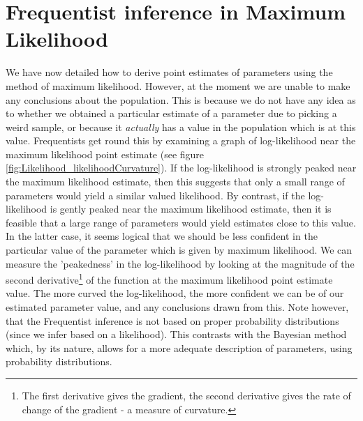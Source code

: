 \documentclass[11pt,fullpage]{book}
\begin{document}
\section{Frequentist inference in Maximum Likelihood}\label{sec:Likelihood_maxlikelihoodInference}
We have now detailed how to derive point estimates of parameters using the method of maximum likelihood. However, at the moment we are unable to make any conclusions about the population. This is because we do not have any idea as to whether we obtained a particular estimate of a parameter due to picking a weird sample, or because it \textit{actually} has a value in the population which is at this value. Frequentists get round this by examining a graph of log-likelihood near the maximum likelihood point estimate (see figure \ref{fig:Likelihood_likelihoodCurvature}). If the log-likelihood is strongly peaked near the maximum likelihood estimate, then this suggests that only a small range of parameters would yield a similar valued likelihood. By contrast, if the log-likelihood is gently peaked near the maximum likelihood estimate, then it is feasible that a large range of parameters would yield estimates close to this value. In the latter case, it seems logical that we should be less confident in the particular value of the parameter which is given by maximum likelihood. We can measure the 'peakedness' in the log-likelihood by looking at the magnitude of the second derivative\footnote{The first derivative gives the gradient, the second derivative gives the rate of change of the gradient - a measure of curvature.} of the function at the maximum likelihood point estimate value. The more curved the log-likelihood, the more confident we can be of our estimated parameter value, and any conclusions drawn from this. Note however, that the Frequentist inference is not based on proper probability distributions (since we infer based on a likelihood). This contrasts with the Bayesian method which, by its nature, allows for a more adequate description of parameters, using probability distributions.
\end{document}
